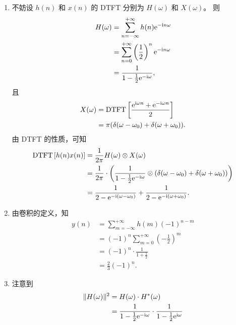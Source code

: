 \begin{solution}
    \begin{enumerate}[label=(\arabic*)]
        \item 不妨设 $h(n)$ 和 $x(n)$ 的 DTFT 分别为 $H(\omega)$ 和 $X(\omega)$。
            则
            \begin{align*}
                H(\omega) & = \sum_{n = -\infty}^{+\infty}h(n)\mathrm{e}^{-\mathrm{i} n\omega} \\
                & = \sum_{n = 0}^{+\infty}\left(\frac{1}{2}\right)^n\mathrm{e}^{-\mathrm{i} n\omega} \\
                & = \frac{1}{1 - \frac{1}{2}\mathrm{e}^{-\mathrm{i}\omega}},
            \end{align*}
            且
            \begin{align*}
                X(\omega) & = \mathrm{DTFT}\left[\frac{\mathrm{e}^{\mathrm{i}\omega n} + \mathrm{e}^{-\mathrm{i}\omega n}}{2}\right] \\
                & = \pi(\delta(\omega - \omega_0) + \delta(\omega + \omega_0)).
            \end{align*}
            由 DTFT 的性质，可知
            \begin{align*}
                \mathrm{DTFT}\left[h(n)x(n)\right] & = \frac{1}{2\pi}H(\omega) \otimes X(\omega) \\
                & = \frac{1}{2\pi}\cdot\left(\frac{1}{1 - \frac{1}{2}\mathrm{e}^{-\mathrm{i}\omega}} \otimes (\delta(\omega - \omega_0) + \delta(\omega + \omega_0))\right) \\
                & = \frac{1}{2 - \mathrm{e}^{-\mathrm{i}(\omega - \omega_0)}} + \frac{1}{2 - \mathrm{e}^{-\mathrm{i}(\omega + \omega_0)}}.
            \end{align*}
        \item 由卷积的定义，知
            \begin{align*}
                y(n) & = \sum_{m = -\infty}^{+\infty}h(m)(-1)^{n-m} \\
                & = (-1)^n\sum_{m = 0}^{+\infty}\left(-\frac{1}{2}\right)^m \\
                & = (-1)^n\cdot \frac{1}{1 + \frac{1}{2}} \\
                & = \frac{2}{3}(-1)^n.
            \end{align*}
        \item 注意到
            \begin{align*}
                \|H(\omega)\|^2 & = H(\omega) \cdot H^*(\omega) \\
                & = \frac{1}{1 - \frac{1}{2}\mathe^{-\mathi\omega}} \cdot \frac{1}{1 - \frac{1}{2}\mathe^{\mathi\omega}} \\

\end{align*}
\end{enumerate}
\end{solution}
